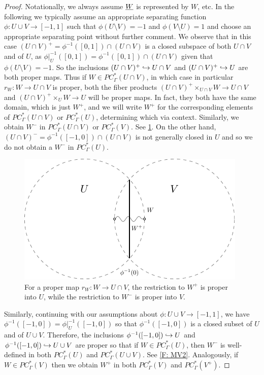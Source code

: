 \begin{proof}
Notationally, we always assume  $\underline{W}$ is represented by $W$, etc.
In the following we typically assume an appropriate separating function $\phi:U\cup V\to [-1,1]$ such that $\phi(U\setminus V)=-1$ and $\phi(V\setminus U)=1$ and choose an appropriate separating point without further comment. We observe that in this case $(U\cap V)^+=\phi^{-1}([0,1])\cap(U\cap V)$ is a closed subspace of both $U\cap V$ and of $U$, as $\phi|_U^{-1}([0,1])=\phi^{-1}([0,1])\cap (U\cap V)$ given that $\phi(U\setminus V)=-1$. So the inclusions $(U\cap V)^+\hookrightarrow U\cap V$ and $(U\cap V)^+\hookrightarrow U$ are both proper maps. Thus if $W\in PC^*_\Gamma(U\cap V)$, in which case in particular $r_W:W\to U\cap V$ is proper, both the fiber products $(U\cap V)^+\times_{U\cap V} W\to U\cap V$ and $(U\cap V)^+\times_{U} W\to U$ will be proper maps. In fact, they both have the same domain, which is just $W^+$, and we will write $W^+$ for the corresponding elements of $PC^*_\Gamma(U\cap V)$ or  $PC^*_\Gamma(U)$, determining which via context. Similarly, we obtain $W^-$ in $PC^*_\Gamma(U\cap V)$ or  $PC^*_\Gamma(V)$. See \cref{F: MV1}. On the other hand, $(U\cap V)^-=\phi^{-1}([-1,0])\cap(U\cap V)$ is not generally closed in $U$ and so we do not obtain a $W^-$ in $PC^*_\Gamma(U)$.

\begin{figure}[h]
	\includegraphics[scale=1]{figures/mayer_vietoris1.pdf}
	\caption{For a proper map $r_W:W\to U\cap V$, the restriction to $W^+$ is proper into $U$, while the restriction to $W^-$ is proper into $V$. }
\label{F: MV1}
\end{figure}




Similarly, continuing with our assumptions about $\phi:U\cup V\to [-1,1]$,  we have $\phi^{-1}([-1,0])= \phi|_U^{-1}([-1,0])$ so that $\phi^{-1}([-1,0])$ is a closed subset of $U$ and of $U\cup V$. Therefore, the inclusions $\phi^{-1}([-1,0])\hookrightarrow U$ and $\phi^{-1}([-1,0])\hookrightarrow U\cup V$ are proper so that if $W\in PC^*_\Gamma(U)$, then $W^-$ is well-defined in both $PC^*_\Gamma(U)$ and $PC^*_\Gamma(U\cup V)$. See \cref{F: MV2}. Analogously, if $W\in PC^*_\Gamma(V)$ then we obtain $W^+$ in both $PC^*_\Gamma(V)$ and $PC^*_\Gamma(V^+)$.



\end{proof}
